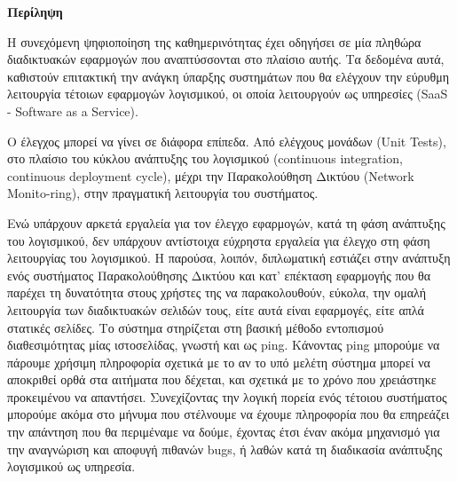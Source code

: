 \begin{center}
  \centering

  \vspace{0.5cm}
  \centering
  \textbf{\Large{Περίληψη}}

  \vspace{1cm}

\end{center}

  Η συνεχόμενη ψηφιοποίηση της καθημερινότητας έχει οδηγήσει σε μία πληθώρα διαδικτυακών εφαρμογών
  που αναπτύσσονται στο πλαίσιο αυτής. Τα δεδομένα αυτά, καθιστούν επιτακτική την ανάγκη ύπαρξης συστημάτων
  που θα ελέγχουν την εύρυθμη λειτουργία τέτοιων εφαρμογών λογισμικού, οι οποία λειτουργούν ως
  υπηρεσίες (SaaS - Software as a Service).
  
  Ο έλεγχος μπορεί να γίνει σε διάφορα επίπεδα. Από ελέγχους μονάδων (Unit Tests), στο πλαίσιο
  του κύκλου ανάπτυξης του λογισμικού (continuous integration, continuous deployment cycle), μέχρι την
  Παρακολούθηση Δικτύου (Network Monito\hyp{}ring), στην πραγματική λειτουργία του συστήματος.  
  
  Ενώ υπάρχουν αρκετά εργαλεία για τον έλεγχο εφαρμογών, κατά τη φάση ανάπτυξης του λογισμικού, δεν υπάρχουν
  αντίστοιχα εύχρηστα εργαλεία για έλεγχο στη φάση λειτουργίας του λογισμικού. Η παρούσα, λοιπόν, διπλωματική εστιάζει
  στην ανάπτυξη ενός συστήματος Παρακολούθησης Δικτύου και κατ' επέκταση
  εφαρμογής που θα παρέχει τη δυνατότητα στους χρήστες της να παρακολουθούν, εύκολα, την ομαλή λειτουργία
  των διαδικτυακών σελιδών τους, είτε αυτά είναι εφαρμογές, είτε απλά στατικές σελίδες.
  Το σύστημα στηρίζεται στη βασική μέθοδο εντοπισμού διαθεσιμότητας μίας ιστοσελίδας, γνωστή και
  ως ping. Κάνοντας ping μπορούμε να πάρουμε χρήσιμη πληροφορία σχετικά με το αν το υπό μελέτη σύστημα
  μπορεί να αποκριθεί ορθά στα αιτήματα που δέχεται, και σχετικά με το χρόνο που χρειάστηκε προκειμένου
  να απαντήσει. Συνεχίζοντας την λογική πορεία ενός τέτοιου συστήματος μπορούμε ακόμα στο μήνυμα που στέλνουμε
  να έχουμε πληροφορία που θα επηρεάζει την απάντηση που θα περιμέναμε να δούμε, έχοντας έτσι έναν ακόμα
  μηχανισμό για την αναγνώριση και αποφυγή πιθανών bugs, ή λαθών κατά τη διαδικασία ανάπτυξης λογισμικού
  ως υπηρεσία.
